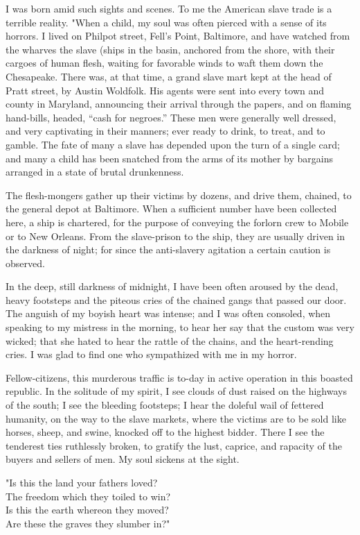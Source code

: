 I was born amid such sights and scenes. To me the American slave trade
is a terrible reality. "When a child, my soul was often pierced with a
sense of its horrors. I lived on Philpot street, Fell's Point,
Baltimore, and have watched from the wharves the slave (ships in the
basin, anchored from the shore, with their cargoes of human flesh,
waiting for favorable winds to waft them down the Chesapeake. There was,
at that time, a grand slave mart kept at the head of Pratt street, by
Austin Woldfolk. His agents were {\protect\hypertarget{448}{}{}}sent
into every town and county in Maryland, announcing their arrival through
the papers, and on flaming hand-bills, headed, ``cash for negroes.''
These men were generally well dressed, and very captivating in their
manners; ever ready to drink, to treat, and to gamble. The fate of many
a slave has depended upon the turn of a single card; and many a child
has been snatched from the arms of its mother by bargains arranged in a
state of brutal drunkenness.

The flesh-mongers gather up their victims by dozens, and drive them,
chained, to the general depot at Baltimore. When a sufficient number
have been collected here, a ship is chartered, for the purpose of
conveying the forlorn crew to Mobile or to New Orleans. From the
slave-prison to the ship, they are usually driven in the darkness of
night; for since the anti-slavery agitation a certain caution is
observed.

In the deep, still darkness of midnight, I have been often aroused by
the dead, heavy footsteps and the piteous cries of the chained gangs
that passed our door. The anguish of my boyish heart was intense; and I
was often consoled, when speaking to my mistress in the morning, to hear
her say that the custom was very wicked; that she hated to hear the
rattle of the chains, and the heart-rending cries. I was glad to find
one who sympathized with me in my horror.

Fellow-citizens, this murderous traffic is to-day in active operation in
this boasted republic. In the solitude of my spirit, I see clouds of
dust raised on the highways of the south; I see the bleeding footsteps;
I hear the doleful wail of fettered humanity, on the way to the slave
markets, where the victims are to be sold like horses, sheep, and swine,
knocked off to the highest bidder. There I see the tenderest ties
ruthlessly broken, to gratify the lust, caprice, and rapacity of the
buyers and sellers of men. My soul sickens at the sight.

{"}Is this the land your fathers loved?\\
{﻿}The freedom which they toiled to win?\\
Is this the earth whereon they moved?\\
{﻿}Are these the graves they slumber in?"

